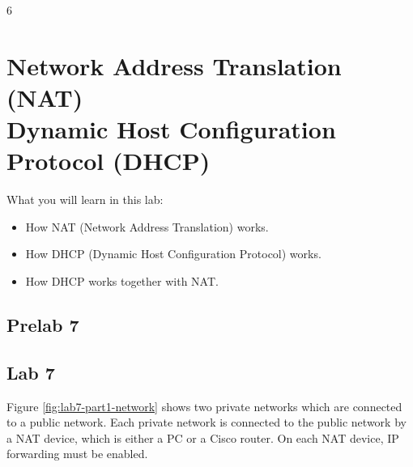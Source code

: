 
\setcounter {chapter} {6} 

\chapter{Network Address Translation (NAT)\\Dynamic Host Configuration Protocol (DHCP)}

What you will learn in this lab:
\begin{itemize}
	\item How NAT (Network Address Translation) works.
	\item How DHCP (Dynamic Host Configuration Protocol) works.
	\item How DHCP works together with NAT.
\end{itemize}

\newpage
{}
\section{Prelab 7}\label{sec:prelab7}


\newpage
{}
\section{Lab 7}\label{sec:lab7}

Figure \ref{fig:lab7-part1-network} shows two private networks which are connected to a public network. Each private network is connected to the public network by a NAT device, which is either a PC or a Cisco router. On each NAT device, IP forwarding must be enabled.



